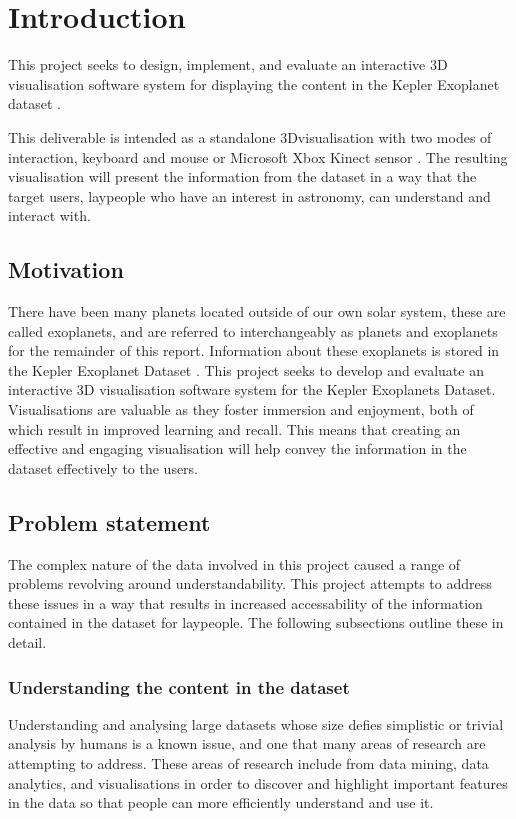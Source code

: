 \chapter{Introduction}\label{C:intro}
This project seeks to design, implement, and evaluate an interactive 3D
visualisation software system for displaying the content in the Kepler
Exoplanet dataset \cite{dataset}.


This deliverable is intended as a standalone
3Dvisualisation with two modes of interaction, keyboard and mouse or Microsoft
Xbox Kinect sensor \cite{kinect}. The resulting visualisation will present the
information from the dataset in a way that the target users, laypeople who have
an
interest in astronomy, can understand and interact with.
\section{Motivation}
There have been many planets located outside of our own solar system,
these are called exoplanets, and are referred to interchangeably as planets and
exoplanets for the remainder of this report. Information about these exoplanets
is stored in the Kepler Exoplanet Dataset
\cite{dataset}. This project seeks to develop and evaluate an interactive 3D
visualisation software system for the Kepler Exoplanets Dataset. Visualisations
are valuable as they foster immersion and enjoyment, both of which result in
improved learning and recall. This means that
creating an effective and engaging visualisation will help convey the
information
in the dataset effectively to the users.
\section{Problem statement}
The complex nature of the data involved in this project caused a range of
problems revolving around understandability. This project
attempts to address these issues in a way that results in increased
accessability of the information contained in the dataset for laypeople. The
following subsections outline these in detail.

\subsection{Understanding the content in the dataset}
Understanding and analysing large datasets whose size defies simplistic or
trivial analysis by humans is a known issue, and one that many areas of research
are
attempting to address. These areas of research include from data mining, data
analytics, and visualisations in order to discover and highlight important
features in the data so that people can more efficiently understand and use it. 

